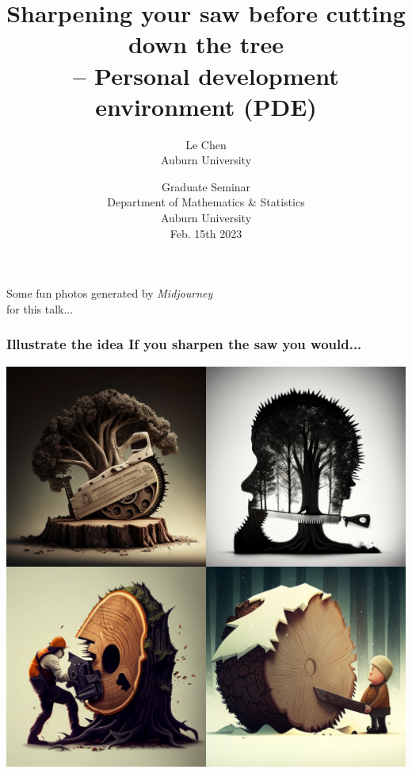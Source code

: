 \documentclass[9pt,table,xcolor=dvipsnames]{beamer}%
\title{Sharpening your saw before cutting down the tree
\\ -- Personal development environment (PDE)}%
\author{Le Chen\\
Auburn University
}
\institute[Auburn University]
{%
\pgfuseimage{Emory}
 }
\date[Columbus]{
  \footnotesize
  Graduate Seminar \\[1em]
  Department of Mathematics \& Statistics\\[0.5em]
  Auburn University\\[1em]
  Feb. 15th 2023\\
}
\theoremstyle{definition}
\theoremstyle{plain}
\begin{document}
\begin{frame}[noframenumbering]
  \titlepage
\end{frame}

\begin{frame}[fragile] %
 
  \begin{center}
    \Large
    Some fun photos generated by \textit{Midjourney}\\
    for this talk...
  \end{center}
\end{frame}

\begin{frame}[fragile,t] %
  \frametitle{Illustrate the idea If you sharpen the saw you would...}
  \begin{center}
    \includegraphics[scale=0.22]{./figs/chenle02_Illustrate_the_idea_If_you_sharpen_the_saw_you_would.png}
  \end{center}
\end{frame}
\end{document}

